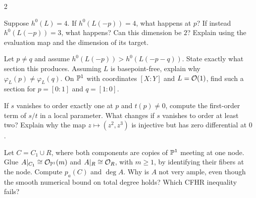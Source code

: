 \documentclass[12pt]{memoir}
\begin{document}
\begin{multicols}{2}
\begin{Ej}\label{ex:evaluation}
Suppose $h^0(L)=4$. If $h^0(L(-p))=4$, what happens at $p$?
If instead $h^0(L(-p))=3$, what happens? Can this dimension be $2$?
Explain using the evaluation map and the dimension of its target.
\end{Ej}

\begin{Ej}\label{ex:points}
Let $p\ne q$ and assume
$h^0(L(-p))>h^0(L(-p-q))$.
State exactly what section this produces. Assuming $L$ is
basepoint-free, explain why $\varphi_L(p)\ne\varphi_L(q)$.
On $\mathbb{P}^1$ with coordinates $[X:Y]$ and $L=\mathcal{O}(1)$, find such
a section for $p=[0:1]$ and $q=[1:0]$.
\end{Ej}

\begin{Ej}\label{ex:tangents}
If $s$ vanishes to order exactly one at $p$ and $t(p)\ne0$, compute
the first-order term of $s/t$ in a local parameter. What changes
if $s$ vanishes to order at least two? Explain why the map
$z\mapsto(z^2,z^3)$ is injective but has zero differential at $0$.
\end{Ej}

\begin{Ej}\label{ex:subcurves}
Let $C=C_1\cup R$, where both components are copies of $\mathbb{P}^1$
meeting at one node. Glue $A|_{C_1}\cong\mathcal{O}_{\mathbb{P}^1}(m)$ and
$A|_R\cong\mathcal{O}_R$, with $m\ge1$, by identifying their fibers at
the node. Compute $p_a(C)$ and $\deg A$. Why is $A$ not very ample,
even though the smooth numerical bound on total degree holds?
Which CFHR inequality fails?
\end{Ej}

\end{multicols}
\clearpage
\end{document}
